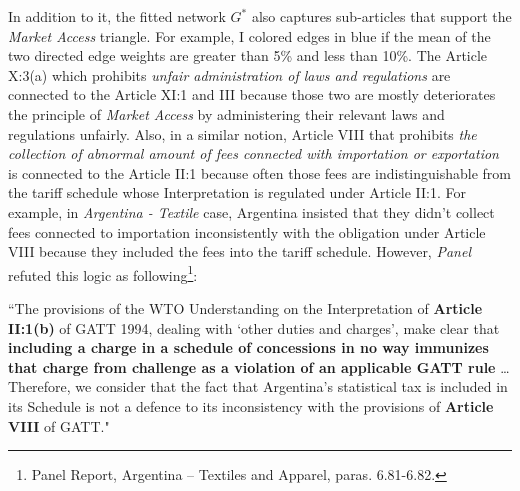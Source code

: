  In addition to it,
 the fitted network $G^*$ also captures sub-articles that support the \textit{Market Access} triangle. For example, I colored edges in blue if the mean of the two directed edge weights are greater than 5\% and less than 10\%.
 The Article X:3(a) which prohibits \textit{unfair administration of laws and regulations} are connected to the Article XI:1 and III because those two are mostly
 deteriorates the principle of \textit{Market Access} by administering their relevant laws and regulations unfairly. Also, in a similar notion, Article VIII that prohibits \textit{the collection of abnormal amount of fees connected with importation or exportation} is connected to the Article II:1 because
 often those fees are indistinguishable from the tariff schedule whose Interpretation is regulated under Article II:1. For example, in \textit{Argentina - Textile} case, Argentina insisted that they didn't collect fees connected to importation inconsistently with the obligation under Article VIII because they included the fees into the tariff schedule. %
 However, \textit{Panel} refuted this logic as following\footnote{Panel Report, Argentina – Textiles and Apparel, paras. 6.81-6.82.}:
  
 \begin{displayquote}[][]
 ``The provisions of the WTO Understanding on the Interpretation of \textbf{Article II:1(b)} of
 GATT 1994, dealing with `other duties and charges’, make clear that \textbf{including a
 charge in a schedule of concessions in no way immunizes that charge from challenge
 as a violation of an applicable GATT rule} \ldots Therefore, we consider that the fact that Argentina's statistical tax is included in its
 Schedule is not a defence to its inconsistency with the provisions of \textbf{Article VIII} of
 GATT."
 \end{displayquote}
  
  
  
  
  
  
  
  
  
 
 